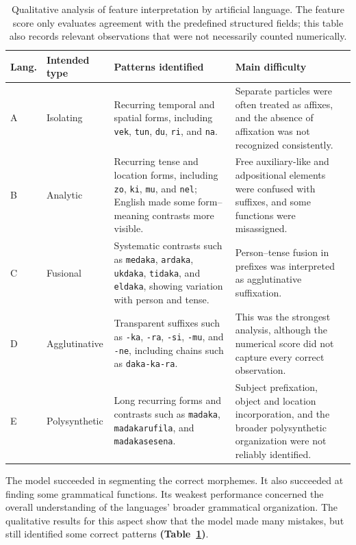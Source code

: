 \documentclass[11pt]{article}
\begin{document}
\begin{table}[t]
    \centering
    \footnotesize
    \setlength{\tabcolsep}{3pt}
    \renewcommand{\arraystretch}{1.15}
    \caption{Qualitative analysis of feature interpretation by artificial language. The feature score only evaluates agreement with the predefined structured fields; this table also records relevant observations that were not necessarily counted numerically.}
    \label{tab:qualitative-features}
    \begin{tabularx}{\textwidth}{@{}>{\raggedright\arraybackslash}p{0.7cm} >{\raggedright\arraybackslash}p{1.6cm} X X@{}}
        \toprule
        Lang. & Intended type & Patterns identified & Main difficulty \\
        \midrule
        A & Isolating & Recurring temporal and spatial forms, including \texttt{vek}, \texttt{tun}, \texttt{du}, \texttt{ri}, and \texttt{na}. & Separate particles were often treated as affixes, and the absence of affixation was not recognized consistently. \\
        B & Analytic & Recurring tense and location forms, including \texttt{zo}, \texttt{ki}, \texttt{mu}, and \texttt{nel}; English made some form--meaning contrasts more visible. & Free auxiliary-like and adpositional elements were confused with suffixes, and some functions were misassigned. \\
        C & Fusional & Systematic contrasts such as \texttt{medaka}, \texttt{ardaka}, \texttt{ukdaka}, \texttt{tidaka}, and \texttt{eldaka}, showing variation with person and tense. & Person--tense fusion in prefixes was interpreted as agglutinative suffixation. \\
        D & Agglutinative & Transparent suffixes such as \texttt{-ka}, \texttt{-ra}, \texttt{-si}, \texttt{-mu}, and \texttt{-ne}, including chains such as \texttt{daka-ka-ra}. & This was the strongest analysis, although the numerical score did not capture every correct observation. \\
        E & Polysynthetic & Long recurring forms and contrasts such as \texttt{madaka}, \texttt{madakarufila}, and \texttt{madakasesena}. & Subject prefixation, object and location incorporation, and the broader polysynthetic organization were not reliably identified. \\
        \bottomrule
    \end{tabularx}
\end{table}

The model succeeded in segmenting the correct morphemes. It also succeeded at finding some grammatical functions. Its weakest performance concerned the overall understanding of the languages' broader grammatical organization. The qualitative results for this aspect show that the model made many mistakes, but still identified some correct patterns \textbf{(Table~\ref{tab:qualitative-features})}.
\end{document}
